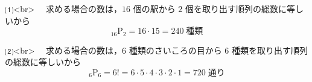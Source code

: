 ⑴<br>
　求める場合の数は，$16$ 個の駅から $2$ 個を取り出す順列の総数に等しいから
$$
  _{16}\mathrm{P}_{2} = 16 \cdot 15 = 240 \;\text{種類}
$$

⑵<br>
　求める場合の数は，$6$ 種類のさいころの目から $6$ 種類を取り出す順列の総数に等しいから
$$
  _{6}\mathrm{P}_{6} = 6! 
  = 6 \cdot 5 \cdot 4 \cdot 3 \cdot 2 \cdot 1
  = 720 \;\text{通り}
$$
